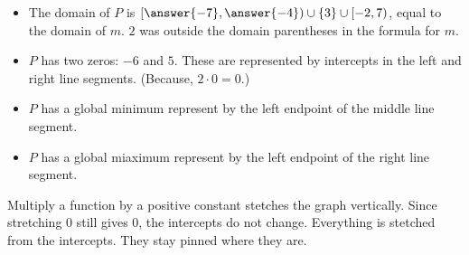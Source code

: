 \documentclass{ximera}
\begin{document}
\begin{example}
\begin{image}
\end{image}




\begin{itemize}

\item The domain of $P$ is $\left[\answer{-7},\answer{-4}\right) \cup \{3\} \cup [-2,7)$, equal to the domain of $m$. $2$ was outside the domain parentheses in the formula for $m$.
\item $P$ has two zeros: $-6$ and $5$. These are represented by intercepts in the left and right line segments. (Because, $2 \cdot 0 = 0$.) \\
\item $P$ has a global minimum represent by the left endpoint of the middle line segment. \\
\item $P$ has a global miaximum represent by the left endpoint of the right line segment.

\end{itemize}


\end{example}


Multiply a function by a positive constant stetches the graph vertically.  Since stretching $0$ still gives $0$, the intercepts do not change.  Everything is stetched from the intercepts. They stay pinned where they are.
\end{document}
